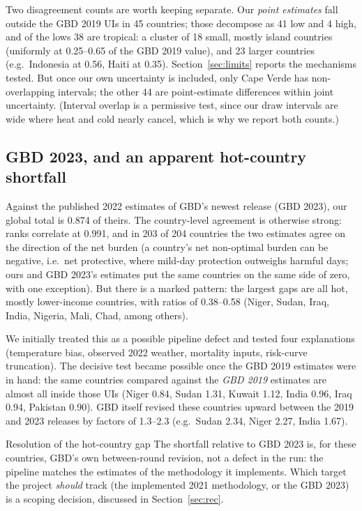 \documentclass[11pt]{ozreport}
\begin{document}
Two disagreement counts are worth keeping separate. Our \emph{point
estimates} fall outside the GBD 2019 UIs in 45 countries; those decompose
as 41 low and 4 high, and of the lows 38 are tropical: a cluster of 18
small, mostly island countries (uniformly at 0.25--0.65 of the GBD 2019
value), and 23 larger countries (e.g.\ Indonesia at 0.56, Haiti at 0.35).
Section~\ref{sec:limits} reports the mechanisms tested. But once our own
uncertainty is included, only Cape Verde has non-overlapping intervals; the
other 44 are point-estimate differences within joint uncertainty. (Interval
overlap is a permissive test, since our draw intervals are wide where heat
and cold nearly cancel, which is why we report both counts.)

\subsection{GBD 2023, and an apparent hot-country shortfall}

Against the published 2022 estimates of GBD's newest release (GBD 2023),
our global total is 0.874 of theirs. The country-level agreement is
otherwise strong: ranks correlate at 0.991, and in 203 of 204 countries the
two estimates agree on the direction of the net burden (a country's net
non-optimal burden can be negative, i.e.\ net protective, where mild-day
protection outweighs harmful days; ours and GBD 2023's estimates put the
same countries on the same side of zero, with one exception). But there is
a marked pattern: the largest gaps are all hot, mostly lower-income
countries, with ratios of 0.38--0.58 (Niger, Sudan, Iraq, India, Nigeria,
Mali, Chad, among others).

We initially treated this as a possible pipeline defect and tested four
explanations (temperature bias, observed 2022 weather, mortality inputs,
risk-curve truncation). The decisive test became possible once the GBD 2019
estimates were in hand: the same countries compared against the \emph{GBD
2019} estimates are almost all inside those UIs (Niger 0.84, Sudan 1.31,
Kuwait 1.12, India 0.96, Iraq 0.94, Pakistan 0.90). GBD itself revised
these countries upward between the 2019 and 2023 releases by factors of
1.3--2.3 (e.g.\ Sudan 2.34, Niger 2.27, India 1.67).

\begin{ozresult}{Resolution of the hot-country gap}
The shortfall relative to GBD 2023 is, for these countries,
GBD's own between-round revision, not a defect in the run: the pipeline
matches the estimates of the methodology it implements. Which target the
project \emph{should} track (the implemented 2021 methodology, or the
GBD 2023) is a scoping decision, discussed in
Section~\ref{sec:rec}.
\end{ozresult}
\end{document}
